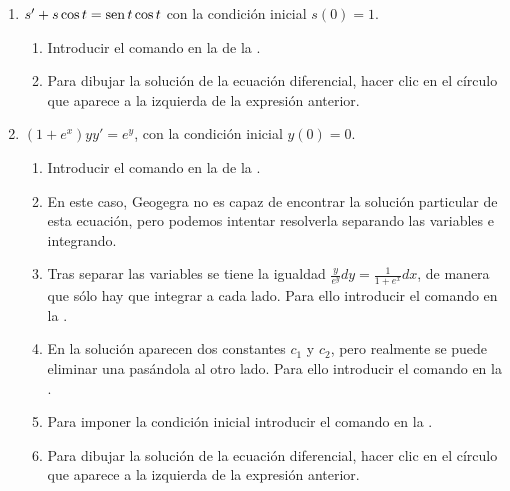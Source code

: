 \begin{enumerate}[leftmargin=*]
\begin{enumerate}
      \item $s'+s\cos t=\operatorname{sen} t\cos t$ con la condición inicial $s(0)=1$.
            \begin{indication}
            \begin{enumerate}
            \item Introducir el comando  en la  de la .
            \item Para dibujar la solución de la ecuación diferencial, hacer clic en el círculo que aparece a la izquierda de la expresión anterior.
            \end{enumerate}
            \end{indication}

      \item $(1+e^x)yy'=e^y$, con la condición inicial $y(0)=0$.
            \begin{indication}
            \begin{enumerate}
            \item Introducir el comando  en la  de la .
            \item En este caso, Geogegra no es capaz de encontrar la solución particular de esta ecuación, pero podemos intentar resolverla separando las variables e integrando.
            \item Tras separar las variables se tiene la igualdad $\frac{y}{e^y}dy = \frac{1}{1+e^x}dx$, de manera que sólo hay que integrar a cada lado.
                  Para ello introducir el comando  en la .
            \item En la solución aparecen dos constantes $c_1$ y $c_2$, pero realmente se puede eliminar una pasándola al otro lado.
                  Para ello introducir el comando  en la .
            \item Para imponer la condición inicial introducir el comando  en la .
            \item Para dibujar la solución de la ecuación diferencial, hacer clic en el círculo que aparece a la izquierda de la expresión anterior.
            \end{enumerate}
            \end{indication}
      \end{enumerate}



\end{enumerate}
